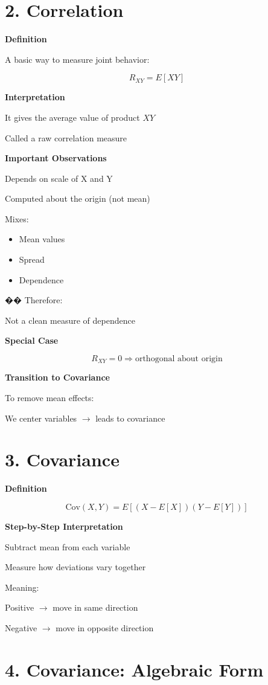 \documentclass[12pt]{article}
\begin{document}
\section*{2. Correlation}

\textbf{Definition}

A basic way to measure joint behavior:

\[
R_{XY} = E[XY]
\]

\textbf{Interpretation}

It gives the average value of product $XY$

Called a raw correlation measure

\textbf{Important Observations}

Depends on scale of X and Y

Computed about the origin (not mean)

Mixes:
\begin{itemize}
\item Mean values
\item Spread
\item Dependence
\end{itemize}

�� Therefore:

Not a clean measure of dependence

\textbf{Special Case}

\[
R_{XY} = 0 \Rightarrow \text{orthogonal about origin}
\]

\textbf{Transition to Covariance}

To remove mean effects:

We center variables $\rightarrow$ leads to covariance

\section*{3. Covariance}

\textbf{Definition}

\[
\text{Cov}(X,Y) = E[(X - E[X])(Y - E[Y])]
\]

\textbf{Step-by-Step Interpretation}

Subtract mean from each variable

Measure how deviations vary together

Meaning:

Positive $\rightarrow$ move in same direction

Negative $\rightarrow$ move in opposite direction

\section*{4. Covariance: Algebraic Form}
\end{document}
